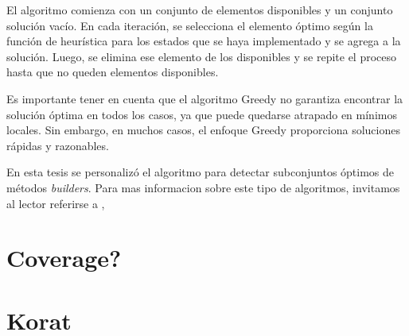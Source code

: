 El algoritmo comienza con un conjunto de elementos disponibles y un conjunto solución vacío. En cada iteración, se selecciona el elemento óptimo según la función de heurística para los estados que se haya implementado y se agrega a la solución. Luego, se elimina ese elemento de los disponibles y se repite el proceso hasta que no queden elementos disponibles.

Es importante tener en cuenta que el algoritmo Greedy no garantiza encontrar la solución óptima en todos los casos, ya que puede quedarse atrapado en mínimos locales. Sin embargo, en muchos casos, el enfoque Greedy proporciona soluciones rápidas y razonables.

En esta tesis se personalizó el algoritmo para detectar subconjuntos óptimos de métodos \emph{builders}. 
Para mas informacion sobre este tipo de algoritmos, invitamos al lector referirse a \cite{Cormen2009}, \cite{kleinberg2006}

\section{Coverage?}

\section{Korat}